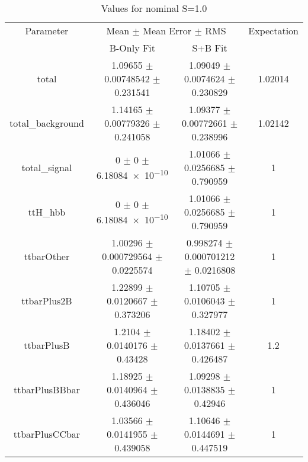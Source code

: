 \begin{table}
\centering
\caption{Values for nominal S=1.0}
\begin{tabular}{cccc}
\toprule
Parameter & \multicolumn{2}{c}{Mean $\pm$ Mean Error $\pm$ RMS} & Expectation\\
 & B-Only Fit & S+B Fit & \\
\midrule
total & \num{1.09655} $\pm$ \num{0.00748542} $\pm$ \num{0.231541} & \num{1.09049} $\pm$ \num{0.0074624} $\pm$ \num{0.230829} & \num{1.02014}\\
total\_background & \num{1.14165} $\pm$ \num{0.00779326} $\pm$ \num{0.241058} & \num{1.09377} $\pm$ \num{0.00772661} $\pm$ \num{0.238996} & \num{1.02142}\\
total\_signal & \num{0} $\pm$ \num{0} $\pm$ \num{6.18084e-10} & \num{1.01066} $\pm$ \num{0.0256685} $\pm$ \num{0.790959} & \num{1}\\
ttH\_hbb & \num{0} $\pm$ \num{0} $\pm$ \num{6.18084e-10} & \num{1.01066} $\pm$ \num{0.0256685} $\pm$ \num{0.790959} & \num{1}\\
ttbarOther & \num{1.00296} $\pm$ \num{0.000729564} $\pm$ \num{0.0225574} & \num{0.998274} $\pm$ \num{0.000701212} $\pm$ \num{0.0216808} & \num{1}\\
ttbarPlus2B & \num{1.22899} $\pm$ \num{0.0120667} $\pm$ \num{0.373206} & \num{1.10705} $\pm$ \num{0.0106043} $\pm$ \num{0.327977} & \num{1}\\
ttbarPlusB & \num{1.2104} $\pm$ \num{0.0140176} $\pm$ \num{0.43428} & \num{1.18402} $\pm$ \num{0.0137661} $\pm$ \num{0.426487} & \num{1.2}\\
ttbarPlusBBbar & \num{1.18925} $\pm$ \num{0.0140964} $\pm$ \num{0.436046} & \num{1.09298} $\pm$ \num{0.0138835} $\pm$ \num{0.42946} & \num{1}\\
ttbarPlusCCbar & \num{1.03566} $\pm$ \num{0.0141955} $\pm$ \num{0.439058} & \num{1.10646} $\pm$ \num{0.0144691} $\pm$ \num{0.447519} & \num{1}\\
\bottomrule
\end{tabular}
\end{table}